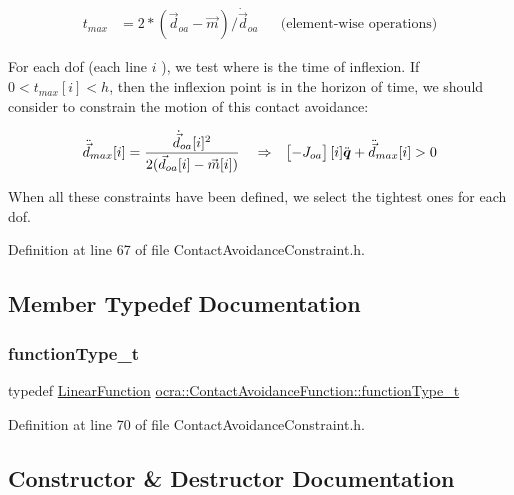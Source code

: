 \begin{align*} t_{max} &= 2*(\vec{d}_{oa} - \vec{m}) / \dot{\vec{d}}_{oa} & & \text{(element-wise operations)} \end{align*}

For each dof (each line $ i $ ), we test where is the time of inflexion. If $ 0 < t_{max}[i] < h$, then the inflexion point is in the horizon of time, we should consider to constrain the motion of this contact avoidance\+:

\begin{align*} \ddot{\vec{d}}_{max}[i] &= \frac{ \dot{\vec{d}}_{oa}[i]^2 }{ 2( \vec{d}_{oa}[i] - \vec{m}[i] ) } & & \Rightarrow & \begin{bmatrix} - J_{oa} \end{bmatrix} [i] \ddot{\mbox{\boldmath${q}$}} + \ddot{\vec{d}}_{max}[i] > 0 \end{align*}

When all these constraints have been defined, we select the tightest ones for each dof. 

Definition at line 67 of file Contact\+Avoidance\+Constraint.\+h.



\subsection{Member Typedef Documentation}
\hypertarget{classocra_1_1ContactAvoidanceFunction_a15d14e0a9e8810d1a6990d5ab7e179ab}{}\label{classocra_1_1ContactAvoidanceFunction_a15d14e0a9e8810d1a6990d5ab7e179ab} 
\subsubsection{\texorpdfstring{function\+Type\+\_\+t}{functionType\_t}}
{\footnotesize\ttfamily typedef \hyperlink{classocra_1_1LinearFunction}{Linear\+Function} \hyperlink{classocra_1_1ContactAvoidanceFunction_a15d14e0a9e8810d1a6990d5ab7e179ab}{ocra\+::\+Contact\+Avoidance\+Function\+::function\+Type\+\_\+t}}



Definition at line 70 of file Contact\+Avoidance\+Constraint.\+h.



\subsection{Constructor \& Destructor Documentation}
\hypertarget{classocra_1_1ContactAvoidanceFunction_a7db869c24ac20e1aff021f95ccf7dcd8}{}\label{classocra_1_1ContactAvoidanceFunction_a7db869c24ac20e1aff021f95ccf7dcd8} 

